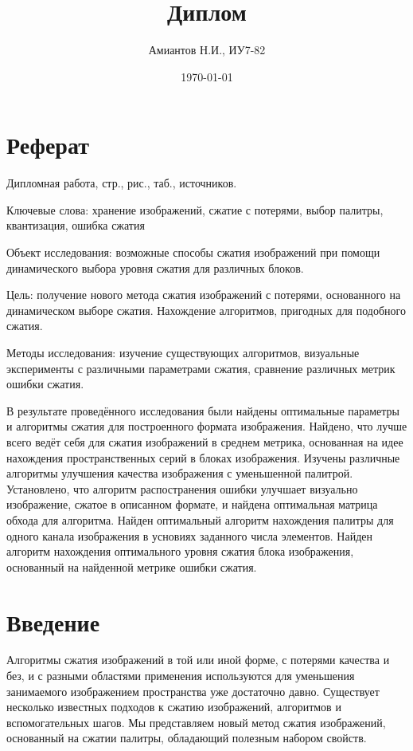 \documentclass[a4paper,12pt]{article}
\title{Диплом}
\author{Амиантов Н.И., ИУ7-82}
\date{\today}
\numberwithin{equation}{section}
\newcounter{refs} %
\begin{document}
\tableofcontents
\newpage

\section*{Реферат}
Дипломная работа,  стр.,
 рис., 
таб.,  источников.

Ключевые слова: хранение изображений, сжатие с потерями, выбор палитры,
квантизация, ошибка сжатия

Объект исследования: возможные способы сжатия изображений при помощи
динамического выбора уровня сжатия для различных блоков.

Цель: получение нового метода сжатия изображений с потерями, основанного на
динамическом выборе сжатия. Нахождение алгоритмов, пригодных для подобного
сжатия.

Методы исследования: изучение существующих алгоритмов, визуальные эксперименты с
различными параметрами сжатия, сравнение различных метрик ошибки сжатия.

В результате проведённого исследования были найдены оптимальные параметры и
алгоритмы сжатия для построенного формата изображения. Найдено, что лучше всего
ведёт себя для сжатия изображений в среднем метрика, основанная на идее
нахождения пространственных серий в блоках изображения. Изучены различные
алгоритмы улучшения качества изображения с уменьшенной палитрой. Установлено,
что алгоритм распостранения ошибки улучшает визуально изображение, сжатое в
описанном формате, и найдена оптимальная матрица обхода для
алгоритма. Найден оптимальный алгоритм нахождения палитры для одного канала
изображения в усновиях заданного числа элементов. Найден алгоритм нахождения
оптимального уровня сжатия блока изображения, основанный на найденной метрике
ошибки сжатия.

\section*{Введение}

Алгоритмы сжатия изображений в той или иной форме, с потерями качества и без, и
с разными областями применения используются для уменьшения занимаемого
изображением пространства уже достаточно давно. Существует несколько известных
подходов к сжатию изображений, алгоритмов и вспомогательных шагов. Мы
представляем новый метод сжатия изображений, основанный на сжатии палитры,
обладающий полезным набором свойств.
\end{document}
